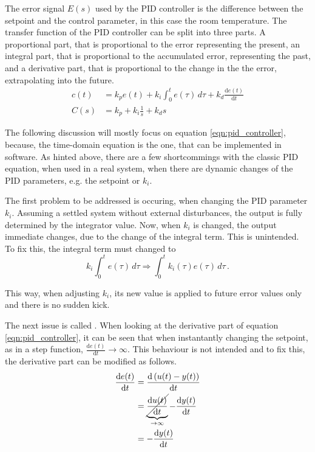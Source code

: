 The error signal $E(s)$ used by the PID controller is the difference between the setpoint and the control parameter, in this case the room temperature. The transfer function of the PID controller can be split into three parts. A proportional part, that is proportional to the error representing the present, an integral part, that is proportional to the accumulated error, representing the past, and a derivative part, that is proportional to the change in the the error, extrapolating into the future.
\begin{align}
    c(t) &= k_p e(t) + k_i \int_0^t e(\tau) \,d\tau + k_d \frac{\mathrm{d}e(t)}{\mathrm{d}t} \label{eqn:pid_controller}\\
    C(s) &= k_p + k_i \frac{1}{s} + k_d s \label{eqn:pid_controller_laplace}
\end{align}

The following discussion will mostly focus on equation \ref{eqn:pid_controller}, because, the time-domain equation is the one, that can be implemented in software. As hinted above, there are a few shortcommings with the classic PID equation, when used in a real system, when there are dynamic changes of the PID parameters, e.g. the setpoint or $k_i$.

The first problem to be addressed is occuring, when changing the PID parameter $k_i$. Assuming a settled system without external disturbances, the output is fully determined by the integrator value. Now, when $k_i$ is changed, the output immediate changes, due to the change of the integral term. This is unintended. To fix this, the integral term must changed to
\begin{equation}
    k_i \int_0^t e(\tau) \,d\tau \Rightarrow \int_0^t k_i(\tau) e(\tau) \,d\tau \,.
\end{equation}

This way, when adjusting $k_i$, its new value is applied to future error values only and there is no sudden kick.

The next issue is called . When looking at the derivative part of equation \ref{eqn:pid_controller}, it can be seen that when instantantly changing the setpoint, as in a step function, $\frac{\mathrm{d}e(t)}{\mathrm{d}t} \to \infty$. This behaviour is not intended and to fix this, the derivative part can be modified as follows.
\begin{align}
    \frac{\mathrm{d}e(t)}{\mathrm{d}t} &= \frac{\mathrm{d}\left(u(t) - y(t)\right)}{\mathrm{d}t} \nonumber\\
    &= \underbrace{\cancel{\frac{\mathrm{d}u(t)}{\mathrm{d}t}}}_{\to \infty} - \frac{\mathrm{d}y(t)}{\mathrm{d}t} \nonumber\\
    &=- \frac{\mathrm{d}y(t)}{\mathrm{d}t}
\end{align}

